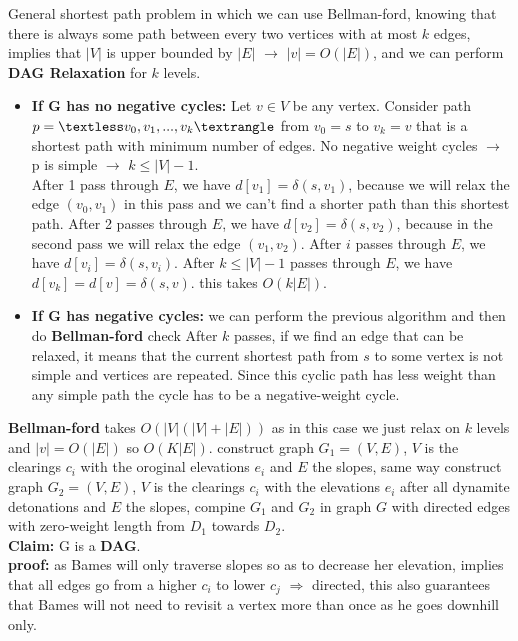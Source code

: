 \documentclass[12pt,twoside]{article}
\begin{document}
\begin{problems}
\newpage
\problem  %
General shortest path problem in which we can use Bellman-ford, knowing that there is always some path between every 
two vertices with at most $k$ edges, implies that $|V|$ is upper bounded by $|E|$ $\rightarrow$ $|v| = O(|E|)$, and 
we can perform \textbf{DAG Relaxation} for $k$ levels. 
\begin{itemize}
  \item \textbf{If G has no negative cycles:} 
    Let $v \in V$ be any vertex. Consider path $p = \textless v_0, v_1, . . . , v_k⟩$ from $v_0 = s$ to $v_k = v$
    that is a shortest path with minimum number of edges. No negative weight cycles $\rightarrow$ p is simple $\rightarrow$
    $k \leq |V| - 1$. \\
    After 1 pass through $E$, we have $d[v_1] = \delta(s, v_1)$, because we will relax the edge $(v_0, v_1)$ in this pass
    and we can’t find a shorter path than this shortest path. 
    After 2 passes through $E$, we have $d[v_2] = \delta(s, v_2)$, 
     because in the second pass we will relax the edge $(v_1, v_2)$.
    After $i$ passes through $E$, we have $d[v_i] = \delta(s, v_i)$.
    After $k \leq |V| - 1$ passes through $E$, we have $d[v_k] = d[v] = \delta(s, v)$. 
    this takes $O(k|E|)$. 
  \item \textbf{If G has negative cycles:} we can perform the previous algorithm and then do \textbf{Bellman-ford} check
    After $k$ passes, if we find an edge that can be relaxed, it means that the current
    shortest path from $s$ to some vertex is not simple and vertices are repeated. Since this
    cyclic path has less weight than any simple path the cycle has to be a negative-weight
    cycle.
\end{itemize}
  \textbf{Bellman-ford} takes $O(|V|(|V| + |E|))$ as in this case we just relax on $k$ levels and $|v| = O(|E|)$ 
  so $O(K|E|)$.
\newpage
\problem  %
  construct graph $G_1 = (V, E)$, $V$ is the clearings $c_i$ with the oroginal elevations $e_i$ and $E$ the slopes, 
  same way construct graph $G_2 = (V, E)$, $V$ is the clearings $c_i$ with the elevations $e_i$ after all dynamite 
  detonations and $E$ the slopes, compine $G_1$ and $G_2$ in graph $G$ with directed edges with zero-weight length from $D_1$ towards $D_2$. \\
  \textbf{Claim:} G is a \textbf{DAG}. \\
  \textbf{proof:} as Bames will only traverse slopes so as to decrease her elevation, implies that all edges go from 
  a higher $c_i$ to lower $c_j$ $\Rightarrow$ directed, this also guarantees that Bames will not need to revisit a vertex 
  more than once as he goes downhill only. \\


\end{problems}
\end{document}
